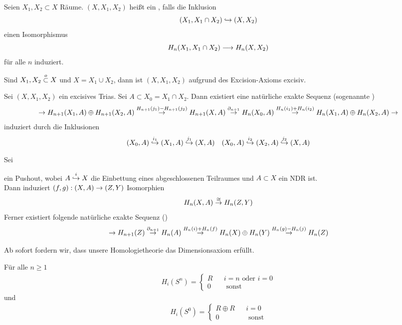 Seien $X_1,X_2 \subset X$ Räume. $(X, X_1, X_2)$ heißt ein , falls die Inklusion
\[(X_1, X_1\cap X_2) \overset{}{\hookrightarrow} (X, X_2)\]
einen Isomorphismus
\[H_n(X_1, X_1\cap X_2) \overset{}{\longrightarrow} H_n(X, X_2)\]
für alle $n$ induziert.

\Bem{}
Sind $X_1,X_2 \overset{o}{\subset} X$ und $X = X_1\cup X_2$, dann ist $(X, X_1, X_2)$ aufgrund des Excision-Axioms excisiv.

Sei $(X,X_1,X_2)$ ein excisives Trias. Sei $A \subset X_0 = X_1\cap X_2$. Dann existiert eine natürliche exakte Sequenz (sogenannte )
\[ \overset{}{\rightarrow} H_{n+1}(X_1,A) \oplus H_{n+1}(X_2,A) \overset{H_{n+1}(j_1) - H_{n+1}(j_2)}{\rightarrow} H_{n+1}(X,A) \overset{\partial_{n+1}}{\rightarrow} H_{n}(X_0,A) \overset{H_n(i_1) + H_n(i_2)}{\rightarrow} H_{n}(X_1,A) \oplus H_{n}(X_2,A) \overset{}{\rightarrow} \]
induziert durch die Inklusionen
\begin{align*}
(X_0,A) \overset{i_1}{\hookrightarrow} (X_1,A) \overset{j_1}{\hookrightarrow} (X,A) && (X_0,A) \overset{i_2}{\hookrightarrow} (X_2,A) \overset{j_2}{\hookrightarrow} (X,A)
\end{align*}


Sei
\begin{center}
\end{center}
ein Pushout, wobei $A \overset{i}{\hookrightarrow} X$ die Einbettung eines abgeschlossenen Teilraumes und $A \subset X$ ein NDR ist.\\
Dann induziert $(f,g) : (X,A) \overset{}{\rightarrow} (Z,Y)$ Isomorphien
\[H_n(X,A) \overset{\cong}{\rightarrow} H_n(Z,Y) \]
Ferner existiert folgende natürliche exakte Sequenz ()
\[ \overset{}{\rightarrow} H_{n+1}(Z) \overset{\partial_{n+1}}{\rightarrow} H_n(A) \overset{H_n(i) + H_n(f)}{\rightarrow} H_n(X) \oplus H_n(Y) \overset{H_n(g) - H_n(j)}{\rightarrow} H_n(Z) \]



Ab sofort fordern wir, dass unsere Homologietheorie das Dimensionsaxiom erfüllt.

\Bem{}
Für alle $n \geq 1$
\begin{align*}
H_i(S^n) =\left\lbrace \begin{aligned}
R && i = n \text{ oder } i = 0\\
0 && \text{ sonst}
\end{aligned}
\right.
\end{align*}
und
\begin{align*}
H_i(S^0) =\left\lbrace \begin{aligned}
R\oplus R && i = 0\\
0 && \text{ sonst}
\end{aligned}
\right.
\end{align*}

